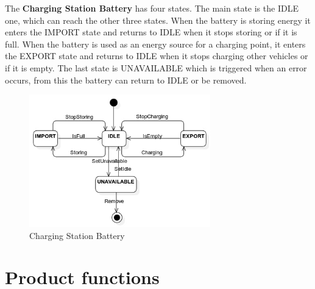 \documentclass{Configuration_Files/PoliMi3i_thesis}
\begin{document}
The \textbf{Charging Station Battery} has four states. The main state is the IDLE one, which can reach the other three states. When the battery is storing energy it enters the IMPORT state and returns to IDLE when it stops storing or if it is full. When the battery is used as an energy source for a charging point, it enters the EXPORT state and returns to IDLE when it stops charging other vehicles or if it is empty. The last state is UNAVAILABLE which is triggered when an error occurs, from this the battery can return to IDLE or be removed.
\begin{figure}[H]
    \centering
    \includegraphics[width=0.7\textwidth]{Images/StateDiagrams/Charging Station Battery.jpg}
    \caption{Charging Station Battery}
\end{figure}

\section{Product functions}
\end{document}
